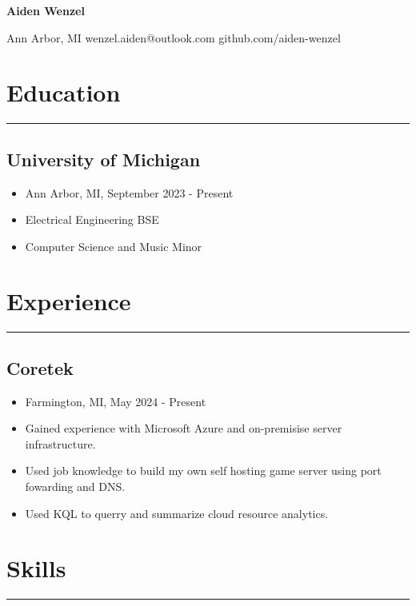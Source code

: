 \documentclass[10pt, letterpaper]{article}
\begin{document}
\thispagestyle{empty}
\begin{center}
	\textbf{\huge{Aiden Wenzel}}
	\vspace{3pt}
	
	Ann Arbor, MI \hspace{5pt} wenzel.aiden@outlook.com \hspace{5pt} github.com/aiden-wenzel
\end{center}

\section*{Education}
\hrule
\vspace{7pt}

\subsection*{University of Michigan}
\begin{itemize}[noitemsep]
	\item Ann Arbor, MI, September 2023 - Present
	\item Electrical Engineering BSE
	\item Computer Science and Music Minor
\end{itemize}

\section*{Experience}
\hrule
\vspace{7pt}

\subsection*{Coretek}
\begin{itemize}[noitemsep]
	\item Farmington, MI, May 2024 - Present
	\item Gained experience with Microsoft Azure and on-premisise server infrastructure.
	\item Used job knowledge to build my own self hosting game server using port fowarding and DNS.
	\item Used KQL to querry and summarize cloud resource analytics.
\end{itemize}

\section*{Skills}
\hrule
\vspace{7pt}
\end{document}

